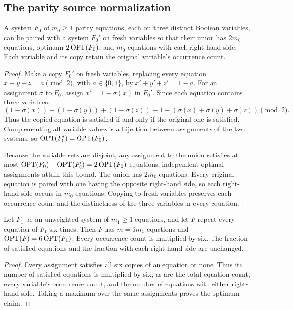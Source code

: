 \subsection{The parity source normalization}
\label{app:xor-normalization}

\begin{lemma}\label{lem:parity-balance}
A system $F_0$ of $m_0\ge1$ parity equations, each on three distinct
Boolean variables, can be paired
with a system $F_0'$ on fresh variables so that their union has
$2m_0$ equations, optimum $2\operatorname{OPT}(F_0)$, and $m_0$ equations with
each right-hand side. Each variable and its copy retain the
original variable's occurrence count.
\end{lemma}

\begin{proof}
Make a copy $F_0'$ on fresh
variables, replacing every equation $x+y+z=a\pmod2$, with
$a\in\{0,1\}$, by
$x'+y'+z'=1-a$. For an assignment $\sigma$ to $F_0$, assign
$x'=1-\sigma(x)$ in $F_0'$. Since each equation contains three variables,
\[
 (1-\sigma(x))+(1-\sigma(y))+(1-\sigma(z))
 \equiv1-(\sigma(x)+\sigma(y)+\sigma(z))\pmod2.
\]
Thus the copied equation is satisfied if and only if the original
one is satisfied. Complementing all variable values is a bijection
between assignments of the two systems, so
$\operatorname{OPT}(F_0')=\operatorname{OPT}(F_0)$.

Because the variable sets are disjoint, any assignment to the union
satisfies at most $\operatorname{OPT}(F_0)+\operatorname{OPT}(F_0')=2\operatorname{OPT}(F_0)$ equations;
independent optimal assignments attain this bound. The union has
$2m_0$ equations. Every original equation is paired with one having
the opposite right-hand side, so each right-hand side occurs in
$m_0$ equations. Copying to fresh variables preserves each
occurrence count and the distinctness of the three variables in
every equation.
\end{proof}

\begin{lemma}\label{lem:parity-repetition}
Let $F_1$ be an unweighted system of $m_1\ge1$ equations, and let
$F$ repeat every equation of $F_1$ six times. Then $F$ has
$m=6m_1$ equations and $\operatorname{OPT}(F)=6\operatorname{OPT}(F_1)$. Every occurrence count
is multiplied by six. The fraction of satisfied equations and the
fraction with each right-hand side are unchanged.
\end{lemma}

\begin{proof}
Every assignment satisfies all six copies of an equation or none.
Thus its number of satisfied equations is multiplied by six, as
are the total equation count, every variable's occurrence count,
and the number of equations with either right-hand side.
Taking a maximum over the same assignments proves the optimum claim.
\end{proof}

